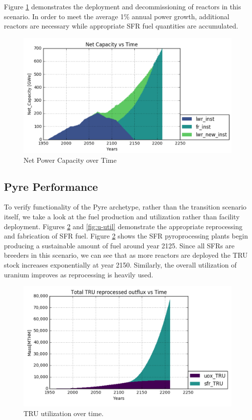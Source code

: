 Figure \ref{fig:net-cap} demonstrates the deployment and decommissioning of reactors in this scenario. In order to meet the average 1\% annual power growth, additional reactors are necessary
while appropriate SFR fuel quantities are accumulated.

\begin{figure} [h]
	\includegraphics[width=\linewidth]{images/transition-netcap}
	\caption{Net Power Capacity over Time}
	\label{fig:net-cap}
\end{figure}

\subsection{Pyre Performance}

To verify functionality of the Pyre archetype, rather than the transition scenario itself, we take a look at the fuel production and utilization rather than facility deployment.
Figures \ref{fig:TRU-util} and \ref{fig:u-util} demonstrate the appropriate reprocessing and fabrication of SFR fuel. Figure \ref{fig:TRU-util} shows the SFR pyroprocessing
plants begin producing a sustainable amount of fuel around year 2125. Since all SFRs are breeders in this scenario, we can see that as more reactors are deployed the TRU stock increases exponentially at year 2150. Similarly, the overall utilization of uranium improves as reprocessing is heavily used.

\begin{figure} [h]
	\includegraphics[width=\linewidth]{images/transition-TRUutil}
	\caption{TRU utilization over time.}
	\label{fig:TRU-util}
\end{figure}

